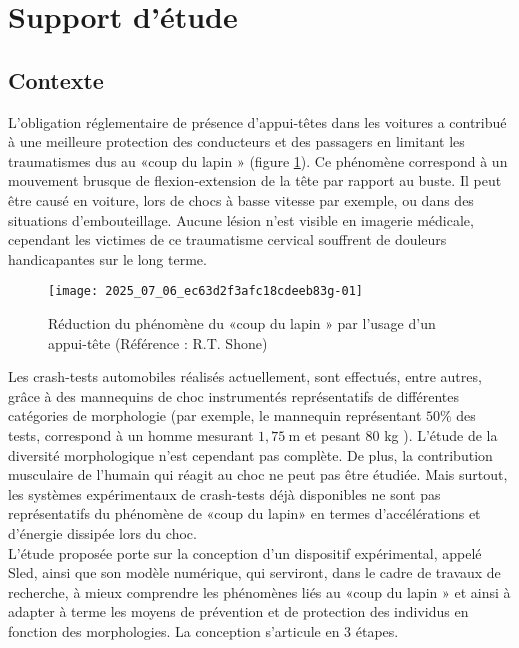 
\section{Support d'étude \label{ccs_mp_2022_sec_1}}
\subsection{Contexte \label{ccs_mp_2022_sec_1A}}
\ifprof
\else
L'obligation réglementaire de présence d'appui-têtes dans les voitures a contribué à une meilleure protection des conducteurs et des passagers en limitant les traumatismes dus au «coup du lapin » (figure \ref{ccs_mp_2022_fig_01}). Ce phénomène correspond à un mouvement brusque de flexion-extension de la tête par rapport au buste. Il peut être causé en voiture, lors de chocs à basse vitesse par exemple, ou dans des situations d'embouteillage. Aucune lésion n'est visible en imagerie médicale, cependant les victimes de ce traumatisme cervical souffrent de douleurs handicapantes sur le long terme.\\

\begin{figure}[!h]
\centering
\texttt{[image: 2025\_07\_06\_ec63d2f3afc18cdeeb83g-01]}

\caption{Réduction du phénomène du «coup du lapin » par l'usage d'un appui-tête (Référence : R.T. Shone) \label{ccs_mp_2022_fig_01}}
\end{figure}

Les crash-tests automobiles réalisés actuellement, sont effectués, entre autres, grâce à des mannequins de choc instrumentés représentatifs de différentes catégories de morphologie (par exemple, le mannequin représentant $50 \%$ des tests, correspond à un homme mesurant $1,75 \mathrm{~m}$ et pesant 80 kg ). L'étude de la diversité morphologique n'est cependant pas complète. De plus, la contribution musculaire de l'humain qui réagit au choc ne peut pas être étudiée. Mais surtout, les systèmes expérimentaux de crash-tests déjà disponibles ne sont pas représentatifs du phénomène de «coup du lapin» en termes d'accélérations et d'énergie dissipée lors du choc.\\
L'étude proposée porte sur la conception d'un dispositif expérimental, appelé Sled, ainsi que son modèle numérique, qui serviront, dans le cadre de travaux de recherche, à mieux comprendre les phénomènes liés au «coup du lapin » et ainsi à adapter à terme les moyens de prévention et de protection des individus en fonction des morphologies. La conception s'articule en 3 étapes.

